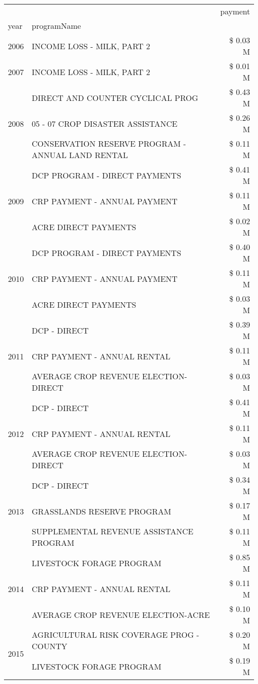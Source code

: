 \begin{tabular}{llr}
\toprule
 &  & payment \\
year & programName &  \\
\midrule
2006 & INCOME LOSS - MILK, PART 2 & \$ 0.03 M \\
\cline{1-3}
2007 & INCOME LOSS - MILK, PART 2 & \$ 0.01 M \\
\cline{1-3}
\multirow[t]{3}{*}{2008} & DIRECT AND COUNTER CYCLICAL PROG & \$ 0.43 M \\
 & 05 - 07 CROP DISASTER ASSISTANCE & \$ 0.26 M \\
 & CONSERVATION RESERVE PROGRAM - ANNUAL LAND RENTAL & \$ 0.11 M \\
\cline{1-3}
\multirow[t]{3}{*}{2009} & DCP PROGRAM - DIRECT PAYMENTS & \$ 0.41 M \\
 & CRP PAYMENT - ANNUAL PAYMENT & \$ 0.11 M \\
 & ACRE DIRECT PAYMENTS & \$ 0.02 M \\
\cline{1-3}
\multirow[t]{3}{*}{2010} & DCP PROGRAM - DIRECT PAYMENTS & \$ 0.40 M \\
 & CRP PAYMENT - ANNUAL PAYMENT & \$ 0.11 M \\
 & ACRE DIRECT PAYMENTS & \$ 0.03 M \\
\cline{1-3}
\multirow[t]{3}{*}{2011} & DCP - DIRECT & \$ 0.39 M \\
 & CRP PAYMENT - ANNUAL RENTAL & \$ 0.11 M \\
 & AVERAGE CROP REVENUE ELECTION-DIRECT & \$ 0.03 M \\
\cline{1-3}
\multirow[t]{3}{*}{2012} & DCP - DIRECT & \$ 0.41 M \\
 & CRP PAYMENT - ANNUAL RENTAL & \$ 0.11 M \\
 & AVERAGE CROP REVENUE ELECTION-DIRECT & \$ 0.03 M \\
\cline{1-3}
\multirow[t]{3}{*}{2013} & DCP - DIRECT & \$ 0.34 M \\
 & GRASSLANDS RESERVE PROGRAM & \$ 0.17 M \\
 & SUPPLEMENTAL REVENUE ASSISTANCE PROGRAM & \$ 0.11 M \\
\cline{1-3}
\multirow[t]{3}{*}{2014} & LIVESTOCK FORAGE PROGRAM & \$ 0.85 M \\
 & CRP PAYMENT - ANNUAL RENTAL & \$ 0.11 M \\
 & AVERAGE CROP REVENUE ELECTION-ACRE & \$ 0.10 M \\
\cline{1-3}
\multirow[t]{3}{*}{2015} & AGRICULTURAL RISK COVERAGE PROG - COUNTY & \$ 0.20 M \\
 & LIVESTOCK FORAGE PROGRAM & \$ 0.19 M \\

\end{tabular}
